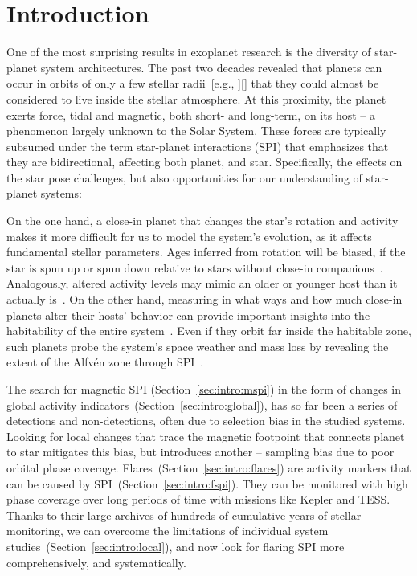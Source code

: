 \documentclass[twocolumn]{aastex631}
\begin{document}
\section{Introduction}
\label{sec:intro}
One of the most surprising results in exoplanet research is the diversity of star-planet system architectures. The past two decades revealed that planets can occur in orbits of only a few stellar radii~[e.g., ][]\citep{sanchis-ojeda2014study} that they could almost be considered to live inside the stellar atmosphere. At this proximity, the planet exerts force, tidal and magnetic, both short- and long-term, on its host -- a phenomenon largely unknown to the Solar System. These forces are typically subsumed under the term star-planet interactions (SPI) that emphasizes that they are bidirectional, affecting both planet, and star. Specifically, the effects on the star pose challenges, but also opportunities for our understanding of star-planet systems:

On the one hand, a close-in planet that changes the star's rotation and activity makes it more difficult for us to model the system's evolution, as it affects fundamental stellar parameters. Ages inferred from rotation will be biased, if the star is spun up or spun down relative to stars without close-in companions~\citep{tejadaarevalo2021further, brown2014discrepancies, maxted2015comparison}. Analogously, altered activity levels may mimic an older or younger host than it actually is~\citep{ilic2022tidal}. On the other hand, measuring in what ways and how much close-in planets alter their hosts' behavior can provide important insights into the habitability of the entire system~\citep{shkolnik2018signatures}. Even if they orbit far inside the habitable zone, such planets probe the system's space weather and mass loss by revealing the extent of the Alfv\'en zone through SPI~\citep{kavanagh2021planetinduced, chebly2022destination}. %

The search for magnetic SPI (Section~\ref{sec:intro:mspi}) in the form of changes in global activity indicators~(Section~\ref{sec:intro:global}), has so far been a series of detections and non-detections, often due to selection bias in the studied systems. Looking for local changes that trace the magnetic footpoint that connects planet to star mitigates this bias, but introduces another -- sampling bias due to poor orbital phase coverage. Flares~(Section~\ref{sec:intro:flares}) are activity markers that can be caused by SPI~(Section~\ref{sec:intro:fspi}). They can be monitored with high phase coverage over long periods of time with missions like Kepler and TESS. Thanks to their large archives of hundreds of cumulative years of stellar monitoring, we can overcome the limitations of individual system studies~(Section~\ref{sec:intro:local}), and now look for flaring SPI more comprehensively, and systematically.
\end{document}
